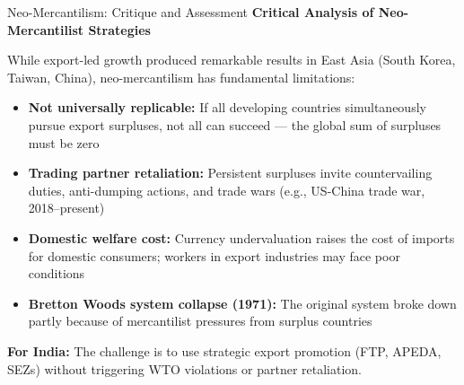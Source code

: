 \documentclass[
  ignorenonframetext,
  aspectratio=169,
]{beamer}
\makeatletter
\providecommand{\tightlist}{%
  \setlength{\itemsep}{0pt}\setlength{\parskip}{0pt}}
\let\quarto@originallabel\label
\DeclareRobustCommand*{\label}[1]{\quarto@originallabel{#1}}
\makeatother
\begin{document}
\begin{frame}{Neo-Mercantilism: Critique and Assessment}
\label{neo-mercantilism-critique-and-assessment}
\textbf{Critical Analysis of Neo-Mercantilist Strategies}

While export-led growth produced remarkable results in East Asia (South
Korea, Taiwan, China), neo-mercantilism has fundamental limitations:

\begin{itemize}
\tightlist
\item
  \textbf{Not universally replicable:} If all developing countries
  simultaneously pursue export surpluses, not all can succeed --- the
  global sum of surpluses must be zero
\item
  \textbf{Trading partner retaliation:} Persistent surpluses invite
  countervailing duties, anti-dumping actions, and trade wars (e.g.,
  US-China trade war, 2018--present)
\item
  \textbf{Domestic welfare cost:} Currency undervaluation raises the
  cost of imports for domestic consumers; workers in export industries
  may face poor conditions
\item
  \textbf{Bretton Woods system collapse (1971):} The original system
  broke down partly because of mercantilist pressures from surplus
  countries
\end{itemize}

\textbf{For India:} The challenge is to use strategic export promotion
(FTP, APEDA, SEZs) without triggering WTO violations or partner
retaliation.
\end{frame}
\end{document}

